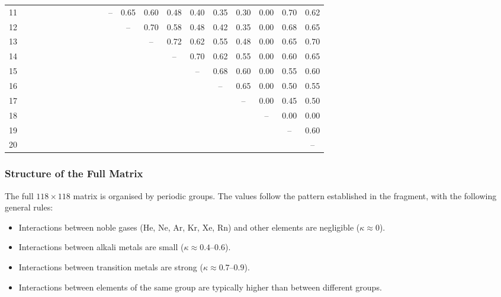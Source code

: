 \documentclass[12pt,a4paper]{article}
\begin{document}
{\begin{longtable}{c|*{20}{c}}
			11 &   &   &   &   &   &   &   &   &   &   & – & 0.65 & 0.60 & 0.48 & 0.40 & 0.35 & 0.30 & 0.00 & 0.70 & 0.62 \\
			12 &   &   &   &   &   &   &   &   &   &   &   & – & 0.70 & 0.58 & 0.48 & 0.42 & 0.35 & 0.00 & 0.68 & 0.65 \\
			13 &   &   &   &   &   &   &   &   &   &   &   &   & – & 0.72 & 0.62 & 0.55 & 0.48 & 0.00 & 0.65 & 0.70 \\
			14 &   &   &   &   &   &   &   &   &   &   &   &   &   & – & 0.70 & 0.62 & 0.55 & 0.00 & 0.60 & 0.65 \\
			15 &   &   &   &   &   &   &   &   &   &   &   &   &   &   & – & 0.68 & 0.60 & 0.00 & 0.55 & 0.60 \\
			16 &   &   &   &   &   &   &   &   &   &   &   &   &   &   &   & – & 0.65 & 0.00 & 0.50 & 0.55 \\
			17 &   &   &   &   &   &   &   &   &   &   &   &   &   &   &   &   & – & 0.00 & 0.45 & 0.50 \\
			18 &   &   &   &   &   &   &   &   &   &   &   &   &   &   &   &   &   & – & 0.00 & 0.00 \\
			19 &   &   &   &   &   &   &   &   &   &   &   &   &   &   &   &   &   &   & – & 0.60 \\
			20 &   &   &   &   &   &   &   &   &   &   &   &   &   &   &   &   &   &   &   & – \\
			\bottomrule
	\end{longtable}}
	
	\subsubsection*{Structure of the Full Matrix}
	The full \(118\times118\) matrix is organised by periodic groups. The values follow the pattern established in the fragment, with the following general rules:
	\begin{itemize}
		\item Interactions between noble gases (He, Ne, Ar, Kr, Xe, Rn) and other elements are negligible (\(\kappa \approx 0\)).
		\item Interactions between alkali metals are small (\(\kappa \approx 0.4\)–\(0.6\)).
		\item Interactions between transition metals are strong (\(\kappa \approx 0.7\)–\(0.9\)).
		\item Interactions between elements of the same group are typically higher than between different groups.
	\end{itemize}
	
\end{document}
